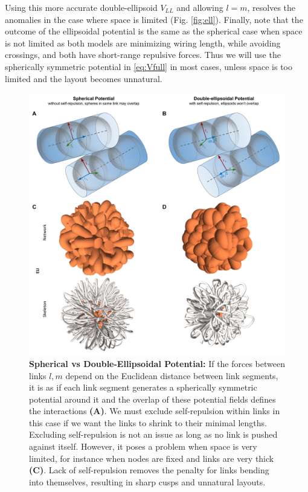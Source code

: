 \documentclass[nofootinbib,preprint,floatfix,titlepage,superscriptaddress]{revtex4} %
\begin{document}
Using this more accurate double-ellipsoid $V_{LL}$ and allowing $l=m$, resolves the anomalies in the case where space is limited (Fig. \ref{fig:ell}). 
Finally, note that the outcome of the ellipsoidal potential is the same as the spherical case when space is not limited as both models are minimizing wiring length, while avoiding crossings, and both have short-range repulsive forces.  
Thus we will use the spherically symmetric potential in \eqref{eq:Vfull} in most cases, unless space is too limited and the layout becomes unnatural. 
\begin{figure}
    \centering
    \includegraphics[width = \columnwidth]{fig-09-19/ellipsoid.pdf}
    \caption{\scriptsize{\bf Spherical vs Double-Ellipsoidal Potential:} If the forces between links $l,m$ depend on the Euclidean distance between link segments,
    it is as if each link segment generates a spherically symmetric potential around it and the overlap of these potential fields defines the interactions {\bf(A)}. 
    We must exclude self-repulsion within links in this case if we want the links to shrink to their minimal lengths.  
    Excluding self-repulsion is not an issue as long as no link is pushed against itself. 
    However, it poses a problem when space is very limited, for instance when nodes are fixed and links are very thick {\bf(C)}. 
    Lack of self-repulsion removes the penalty for links bending into themselves, resulting in sharp cusps and unnatural layouts.  
}
\end{figure}
\end{document}
